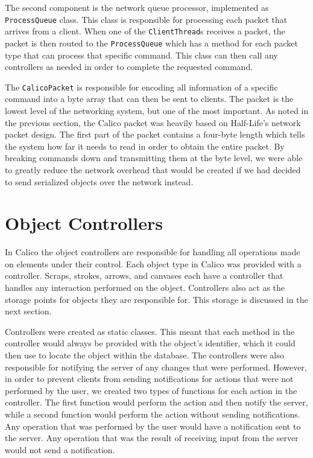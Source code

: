 The second component is the network queue processor, implemented as \texttt{ProcessQueue} class. This class is responsible for processing each packet that arrives from a client. When one of the \texttt{ClientThread}s receives a packet, the packet is then routed to the \texttt{ProcessQueue} which has a method for each packet type that can process that specific command. This class can then call any controllers as needed in order to complete the requested command.

The \texttt{CalicoPacket} is responsible for encoding all information of a specific command into a byte array that can then be sent to clients. The packet is the lowest level of the networking system, but one of the most important. As noted in the previous section, the Calico packet was heavily based on Half-Life's network packet design. The first part of the packet contains a four-byte length which tells the system how far it needs to read in order to obtain the entire packet. By breaking commands down and transmitting them at the byte level, we were able to greatly reduce the network overhead that would be created if we had decided to send serialized objects over the network instead.


\section{Object Controllers}
In Calico the object controllers are responsible for handling all operations made on elements under their control. Each object type in Calico was provided with a controller.
Scraps, strokes, arrows, and canvases each have a controller that handles any interaction performed on the object. 
Controllers also act as the storage points for objects they are responsible for. This storage is discussed in the next section.

Controllers were created as static classes. This meant that each method in the controller would always be provided with the object's identifier, which it could then use to locate the object within the database. 
The controllers were also responsible for notifying the server of any changes that were performed. However, in order to prevent clients from sending notifications for actions that were not performed by the user, we created two types of functions for each action in the controller. The first function would perform the action and then notify the server, while a second function would perform the action without sending notifications. Any operation that was performed by the user would have a notification sent to the server. Any operation that was the result of receiving input from the server would not send a notification.



